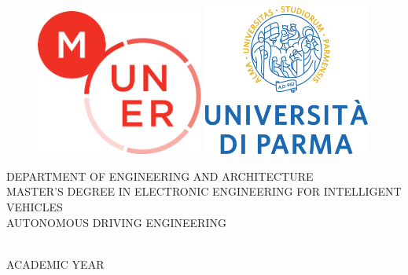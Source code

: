{
    \thispagestyle{empty}
    \linespread{1.2}\selectfont
    \mbox{}
    \vspace{-2 cm}
    \begin{center}
    \begin{figure}[h]
    \begin{center}
    \includegraphics[width=5.5cm]{LateX/figs/LOGO MUNER (2)_764.png}
    \hspace{1cm}
    \includegraphics[width=5.5cm]{LateX/figs/UNIPR_CENTRATO_2RIGHE_POS_CMYK.png}
    \end{center}
    \end{figure}
    
    \setlength{\headwidth}{\textwidth}
    
    \vspace{0.75 cm}
    \large\textsc{DEPARTMENT OF ENGINEERING AND ARCHITECTURE}\\[5mm]
    \large\textsc{MASTER’S DEGREE IN ELECTRONIC ENGINEERING FOR INTELLIGENT VEHICLES}\\
    \large\textsc{AUTONOMOUS DRIVING ENGINEERING}\\
    
    \vspace{1.0 cm}
    \Large\textbf{\MakeUppercase{\thesistitle}}\\
    \vspace{1.0 cm}
    
    
    \vspace{0.5 cm}
    \vspace{1.5 cm}
    \centering
    \large\textsc{ACADEMIC YEAR \acyear}\\
    \end{center}
    
    \cleardoublepage
}